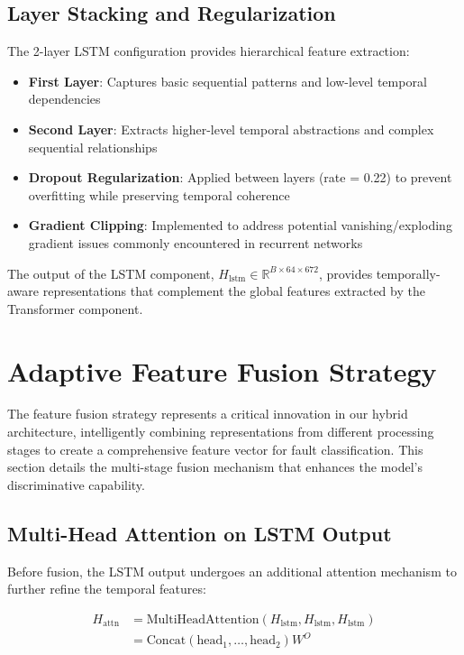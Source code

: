 \subsection{Layer Stacking and Regularization}
\label{subsec:lstm_regularization}

The 2-layer LSTM configuration provides hierarchical feature extraction:

\begin{itemize}
    \item \textbf{First Layer}: Captures basic sequential patterns and low-level temporal dependencies
    \item \textbf{Second Layer}: Extracts higher-level temporal abstractions and complex sequential relationships
    \item \textbf{Dropout Regularization}: Applied between layers (rate = 0.22) to prevent overfitting while preserving temporal coherence
    \item \textbf{Gradient Clipping}: Implemented to address potential vanishing/exploding gradient issues commonly encountered in recurrent networks \citep{pascanu2013difficulty}
\end{itemize}

The output of the LSTM component, $H_{\text{lstm}} \in \mathbb{R}^{B \times 64 \times 672}$, provides temporally-aware representations that complement the global features extracted by the Transformer component.

\section{Adaptive Feature Fusion Strategy}
\label{sec:hybrid_model:fusion_strategy}

The feature fusion strategy represents a critical innovation in our hybrid architecture, intelligently combining representations from different processing stages to create a comprehensive feature vector for fault classification. This section details the multi-stage fusion mechanism that enhances the model's discriminative capability.

\subsection{Multi-Head Attention on LSTM Output}
\label{subsec:lstm_attention}

Before fusion, the LSTM output undergoes an additional attention mechanism to further refine the temporal features:

\begin{align}
H_{\text{attn}} &= \text{MultiHeadAttention}(H_{\text{lstm}}, H_{\text{lstm}}, H_{\text{lstm}}) \\
&= \text{Concat}(\text{head}_1, \ldots, \text{head}_2)W^O
\end{align}


